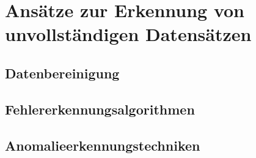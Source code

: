 \section{Ansätze zur Erkennung von unvollständigen Datensätzen}\label{sec:recognition}

\subsection{Datenbereinigung}\label{sec:recognition-data-cleansing}

\subsection{Fehlererkennungsalgorithmen}\label{sec:recognition-error-detection-algorithms}

\subsection{Anomalieerkennungstechniken}\label{sec:recognition-anomaly}